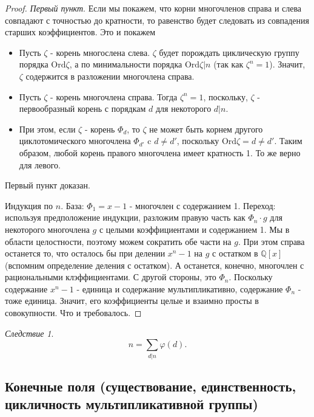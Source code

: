 \documentclass[a4paper,100pt]{article}
\theoremstyle{indented}
\theoremstyle{definition}
\theoremstyle{remark}
\newtheorem{cons}{Следствие}
\begin{document}
\begin{proof}
    \textit{Первый пункт}. Если мы покажем, что корни многочленов справа и слева совпадают с точностью до кратности, то равенство будет следовать из совпадения старших коэффициентов. Это и покажем\ 

    \begin{itemize}
        \item Пусть $\zeta$ - корень многослена слева. $\zeta$ будет порождать циклическую группу порядка $\text{Ord} \zeta$, а по минимальности порядка $\text{Ord}\zeta\vert n$ (так как $\zeta^n=1$). Значит, $\zeta$ содержится в разложении многочлена справа.
        \item Пусть $\zeta$ - корень многочлена справа. Тогда $\zeta^n=1$, поскольку, $\zeta$ - первообразный корень с порядкам $d$ для некоторого $d\vert n$.
        \item При этом, если $\zeta$ - корень $\Phi_d$, то $\zeta$ не может быть корнем другого циклотомического многочлена $\Phi_{d'}$ c $d\neq d'$, поскольку $\text{Ord}\zeta=d\neq d'$. Таким образом, любой корень правого многочлена имеет кратность 1. То же верно для левого.
    \end{itemize}
    
    Первый пункт доказан.\ 

    Индукция по $n$. База: $\Phi_1=x-1$ - многочлен с содержанием 1. Переход: используя предположение индукции, разложим правую часть как $\Phi_n\cdot g$ для некоторого многочлена $g$ с целыми коэффициентами и содержанием 1. Мы в области целостности, поэтому можем сократить обе части на $g$. При этом справа останется то, что осталось бы при делении $x^n-1$ на $g$ с остатком в $\mathbb{Q}[x]$ (вспомним определение деления с остатком). А останется, конечно, многочлен с рациональными клэффициентами. С другой стороны, это $\Phi_n$. Поскольку содержание $x^n-1$ - единица и содержание мультипликативно, содержание $\Phi_n$ - тоже единица. Значит, его коэффициенты целые и взаимно просты в совокупности. Что и требовалось.
\end{proof}

\begin{cons}
    \[
        n=\sum_{d\vert n}\varphi(d).
    \]
\end{cons}

\resetall

\subsection{Конечные поля (существование, единственность, цикличность мультипликативной группы)}
\end{document}
